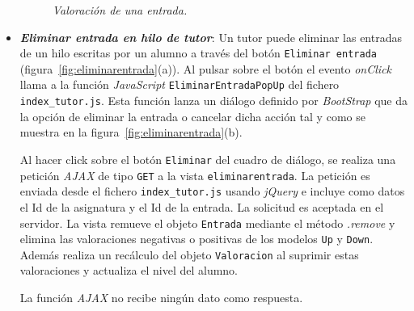 \documentclass[a4paper, 12pt]{book}
\begin{document}
\begin{itemize}
  \begin{figure}
    \centering
    \caption{\textit{Valoraci\'on de una entrada.}}
    \label{fig:hilos}
  \end{figure}

  \item {\bfseries \textit{Eliminar entrada en hilo de tutor}}: Un tutor puede eliminar las entradas de un hilo escritas por un alumno a trav\'es del 
  bot\'on \texttt{Eliminar entrada} (figura~\ref{fig:eliminarentrada}(a)). Al pulsar sobre el bot\'on el evento \textit{onClick} llama a la funci\'on 
  \textit{JavaScript} \texttt{EliminarEntradaPopUp} del fichero \texttt{index\_tutor.js}. Esta funci\'on lanza un di\'alogo definido por \textit{BootStrap} 
  que da la opci\'on de eliminar la entrada o cancelar dicha acci\'on tal y como se muestra en la figura~\ref{fig:eliminarentrada}(b). 
  
  Al hacer click sobre el bot\'on \texttt{Eliminar} del cuadro de di\'alogo, se realiza una petici\'on \textit{AJAX} de tipo \texttt{GET} a la vista 
  \texttt{eliminarentrada}. La petici\'on es enviada desde el fichero \texttt{index\_tutor.js} usando \textit{jQuery} e incluye como datos el 
  Id de la asignatura y el Id de la entrada. La solicitud es aceptada en el servidor. La vista remueve el objeto \texttt{Entrada} mediante el m\'etodo 
  \textit{.remove} y elimina las valoraciones negativas o positivas de los modelos \texttt{Up} y \texttt{Down}. Adem\'as realiza un rec\'alculo del objeto 
  \texttt{Valoracion} al suprimir estas valoraciones y actualiza el nivel del alumno.
  
  La funci\'on \textit{AJAX} no recibe ning\'un dato como respuesta.
  

\end{itemize}
\end{document}
